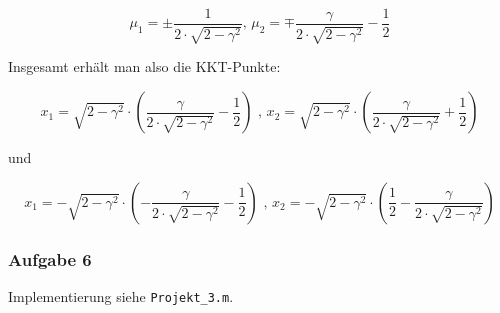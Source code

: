 \documentclass[a4paper, 12pt]{report}
\begin{document}
$$\mu_1 = \pm \frac{1}{2\cdot \sqrt{2 - \gamma^2}} \text{, } \mu_2 = \mp \frac{\gamma}{2\cdot \sqrt{2 - \gamma^2}} - \frac{1}{2}$$

Insgesamt erhält man also die KKT-Punkte:

$$x_1 = \sqrt{2 - \gamma^2} \cdot \left( \frac{\gamma}{2\cdot\sqrt{2 - \gamma^2}} - \frac{1}{2} \right) \text{ , } x_2 = \sqrt{2 - \gamma^2} \cdot \left( \frac{\gamma}{2\cdot\sqrt{2 - \gamma^2}} + \frac{1}{2} \right)$$

und

$$x_1 = -\sqrt{2 - \gamma^2}\cdot \left(-\frac{\gamma}{2\cdot \sqrt{2 - \gamma^2}} - \frac{1}{2}\right) \text{ , } x_2 = -\sqrt{2 - \gamma^2} \cdot \left( \frac{1}{2} - \frac{\gamma}{2\cdot\sqrt{2 - \gamma^2}} \right)$$

\subsubsection{Aufgabe 6}

Implementierung siehe \lstinline[basicstyle=\ttfamily\color{black}]|Projekt_3.m|.
\end{document}
